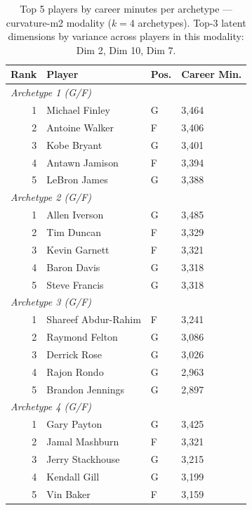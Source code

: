 \begin{table}[htbp]
  \centering\small
  \begin{tabular}{rlll}
    \toprule
    Rank & Player & Pos. & Career Min. \\
    \midrule
    \multicolumn{4}{l}{\textit{Archetype 1 (G/F)}} \\
    \midrule
    1 & Michael Finley & G & 3,464 \\
    2 & Antoine Walker & F & 3,406 \\
    3 & Kobe Bryant & G & 3,401 \\
    4 & Antawn Jamison & F & 3,394 \\
    5 & LeBron James & G & 3,388 \\
    \midrule[0.4pt]
    \multicolumn{4}{l}{\textit{Archetype 2 (G/F)}} \\
    \midrule
    1 & Allen Iverson & G & 3,485 \\
    2 & Tim Duncan & F & 3,329 \\
    3 & Kevin Garnett & F & 3,321 \\
    4 & Baron Davis & G & 3,318 \\
    5 & Steve Francis & G & 3,318 \\
    \midrule[0.4pt]
    \multicolumn{4}{l}{\textit{Archetype 3 (G/F)}} \\
    \midrule
    1 & Shareef Abdur-Rahim & F & 3,241 \\
    2 & Raymond Felton & G & 3,086 \\
    3 & Derrick Rose & G & 3,026 \\
    4 & Rajon Rondo & G & 2,963 \\
    5 & Brandon Jennings & G & 2,897 \\
    \midrule[0.4pt]
    \multicolumn{4}{l}{\textit{Archetype 4 (G/F)}} \\
    \midrule
    1 & Gary Payton & G & 3,425 \\
    2 & Jamal Mashburn & F & 3,321 \\
    3 & Jerry Stackhouse & G & 3,215 \\
    4 & Kendall Gill & G & 3,199 \\
    5 & Vin Baker & F & 3,159 \\
    \bottomrule
  \end{tabular}
  \caption{Top 5 players by career minutes per archetype --- curvature-m2 modality ($k=4$ archetypes). Top-3 latent dimensions by variance across players in this modality: Dim 2, Dim 10, Dim 7.}
  \label{tab:arch_reps_curvature_m2}
\end{table}

